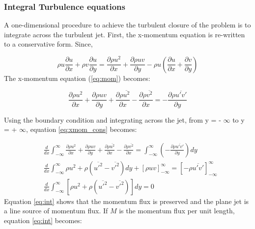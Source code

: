 


\subsubsection{Integral Turbulence equations} 
A one-dimensional procedure to achieve the turbulent closure of the problem is to integrate across the turbulent jet. First, the x-momentum equation is re-written to a conservative form. Since, 

\begin{equation}
    \rho u \frac{\partial u}{\partial x} + \rho v \frac{\partial u}{\partial y} = \frac{\partial \rho u^2}{\partial x} + \frac{\partial \rho uv}{\partial y} - \rho u (\frac{\partial u}{\partial x} + \frac{\partial v}{\partial y})
\end{equation}
\noindent The x-momentum equation (\ref{eq:mom}) becomes:

\begin{equation}
    \frac{\partial \rho u^2}{\partial x} + \frac{\partial \rho uv}{\partial y} + \frac{\partial \rho \overline{u^2}}{\partial x} - \frac{\partial \rho \overline{v^2}}{\partial x} = - \frac{\partial \rho \overline{u'v'}}{\partial y}
    \label{eq:xmom_cons}
\end{equation}

\noindent Using the boundary condition and integrating across the jet, from y = - $\infty$ to y = + $\infty$, equation \ref{eq:xmom_cons} becomes:

\begin{equation}
\begin{split}
    &\frac{d}{dx} \int_{-\infty}^{\infty} \frac{\partial \rho u^2}{\partial x} + \frac{\partial \rho uv}{\partial y} + \frac{\partial \rho \overline{u^2}}{\partial x} - \frac{\partial \rho \overline{v^2}}{\partial x} = \int_{-\infty}^{\infty} (- \frac{\partial \rho \overline{u'v'}}{\partial y})dy \\
    &\frac{d}{dx} \int_{-\infty}^{\infty} \rho u^2 + \rho (\overline{u'^2} - \overline{v'^2})dy + [\rho uv]_{-\infty}^{\infty} = [- \rho \overline{u'v'}]_{-\infty}^{\infty} \\
    &\frac{d}{dx} \int_{-\infty}^{\infty} [\rho u^2 + \rho (\overline{u'^2} - \overline{v'^2})]dy = 0 
    \end{split}
    \label{eq:int}
\end{equation}
\noindent Equation \ref{eq:int} shows that the momentum flux is preserved and the plane jet is a line source of momentum flux. If $M$ is the momentum flux per unit length, equation \ref{eq:int} becomes:

